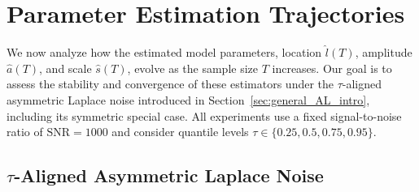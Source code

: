 \documentclass[12pt,a4paper]{article}
\begin{document}
	{\color{blue}
		\section{Parameter Estimation Trajectories}
		\label{sec:parameter_estimation_paths}
		
		We now analyze how the estimated model parameters, location $\hat{l}(T)$, amplitude $\hat{a}(T)$, and scale $\hat{s}(T)$, evolve as the sample size $T$ increases. Our goal is to assess the stability and convergence of these estimators under the $\tau$-aligned asymmetric Laplace noise introduced in Section~\ref{sec:general_AL_intro}, including its symmetric special case. All experiments use a fixed signal-to-noise ratio of $\mathrm{SNR}=1000$ and consider quantile levels
		\(
		\tau\in\{0.25,0.5,0.75,0.95\}.
		\)
		
		\subsection{$\tau$-Aligned Asymmetric Laplace Noise}
		\label{subsec:asymmetric_laplace_trajectories}
		
}
\end{document}

